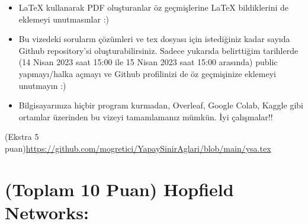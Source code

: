 \documentclass[11pt]{article}
\begin{document}
\begin{itemize}
    \item LaTeX kullanarak PDF oluşturanlar öz geçmişlerine LaTeX bildiklerini de eklemeyi unutmasınlar :)
    \item Bu vizedeki soruların çözümleri ve tex dosyası için istediğiniz kadar sayıda Github repository'si oluşturabilirsiniz. Sadece yukarıda belirttiğim tarihlerde (14 Nisan 2023 saat 15:00 ile 15 Nisan 2023 saat 15:00 arasında) public yapmayı/halka açmayı ve Github profilinizi de öz geçmişinize eklemeyi unutmayın :)
    \item Bilgisayarınıza hiçbir program kurmadan, Overleaf, Google Colab, Kaggle gibi ortamlar üzerinden bu vizeyi tamamlamanız mümkün. İyi çalışmalar!!
\end{itemize}

(Ekstra 5 puan)\url{https://github.com/mogretici/YapaySinirAglari/blob/main/ysa.tex}

\newpage
\section{(Toplam 10 Puan) Hopfield Networks:}
\end{document}
